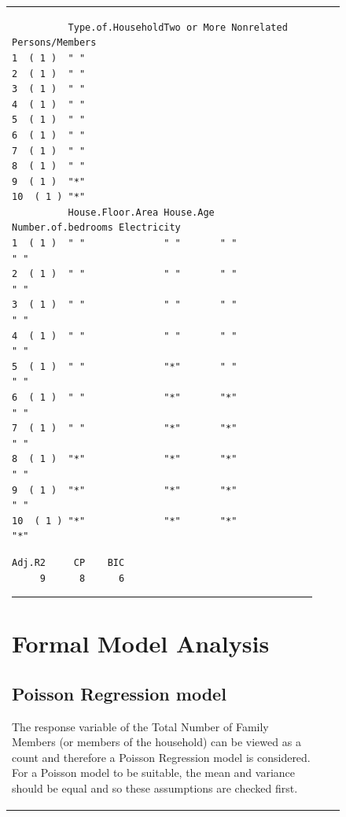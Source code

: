 \documentclass[
]{article}
\begin{document}
\begin{figure}[H]
\begin{table}[H]
\begin{tabular}[t]{lrr}
\begin{verbatim}
          Type.of.HouseholdTwo or More Nonrelated Persons/Members
1  ( 1 )  " "                                                    
2  ( 1 )  " "                                                    
3  ( 1 )  " "                                                    
4  ( 1 )  " "                                                    
5  ( 1 )  " "                                                    
6  ( 1 )  " "                                                    
7  ( 1 )  " "                                                    
8  ( 1 )  " "                                                    
9  ( 1 )  "*"                                                    
10  ( 1 ) "*"                                                    
          House.Floor.Area House.Age Number.of.bedrooms Electricity
1  ( 1 )  " "              " "       " "                " "        
2  ( 1 )  " "              " "       " "                " "        
3  ( 1 )  " "              " "       " "                " "        
4  ( 1 )  " "              " "       " "                " "        
5  ( 1 )  " "              "*"       " "                " "        
6  ( 1 )  " "              "*"       "*"                " "        
7  ( 1 )  " "              "*"       "*"                " "        
8  ( 1 )  "*"              "*"       "*"                " "        
9  ( 1 )  "*"              "*"       "*"                " "        
10  ( 1 ) "*"              "*"       "*"                "*"        
\end{verbatim}

\begin{verbatim}
Adj.R2     CP    BIC 
     9      8      6 
\end{verbatim}

\begin{center}\rule{0.5\linewidth}{0.5pt}\end{center}

\newpage

\hypertarget{sec:FMA}{%
\section{Formal Model Analysis}\label{sec:FMA}}

\hypertarget{poisson-regression-model}{%
\subsection{Poisson Regression model}\label{poisson-regression-model}}

The response variable of the Total Number of Family Members (or members
of the household) can be viewed as a count and therefore a Poisson
Regression model is considered. For a Poisson model to be suitable, the
mean and variance should be equal and so these assumptions are checked
first.


\end{tabular}
\end{table}
\end{figure}
\end{document}
